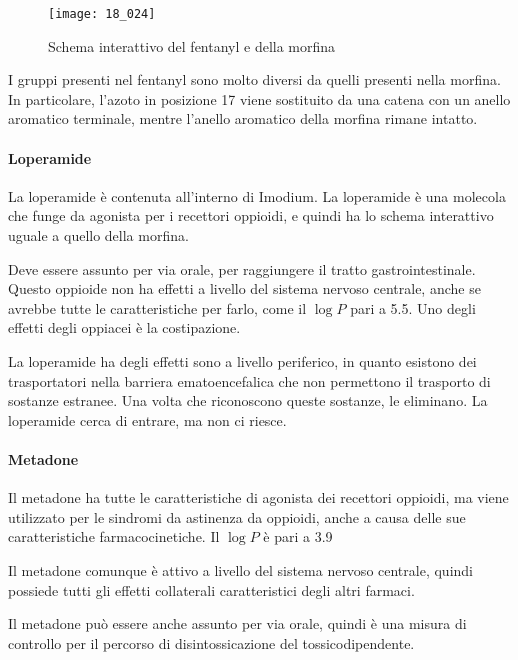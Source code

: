 \begin{figure}[H]
  \centering
  \texttt{[image: 18\_024]}
  \caption{Schema interattivo del fentanyl e della morfina}
\end{figure}

I gruppi presenti nel fentanyl sono molto diversi da quelli presenti
nella morfina. In particolare, l'azoto in posizione 17 viene sostituito
da una catena con un anello aromatico terminale, mentre l'anello
aromatico della morfina rimane intatto.

\paragraph{Loperamide}
La loperamide è contenuta all'interno di Imodium. La loperamide è una
molecola che funge da agonista per i recettori oppioidi, e quindi ha lo
schema interattivo uguale a quello della morfina.

Deve essere assunto per via orale, per raggiungere il tratto
gastrointestinale. Questo oppioide non ha effetti a livello del sistema
nervoso centrale, anche se avrebbe tutte le caratteristiche per farlo,
come il \(\log{} P\) pari a 5.5. Uno degli effetti degli oppiacei è la
costipazione.

La loperamide ha degli effetti sono a livello periferico, in quanto
esistono dei trasportatori nella barriera ematoencefalica che non
permettono il trasporto di sostanze estranee. Una volta che riconoscono
queste sostanze, le eliminano. La loperamide cerca di entrare, ma non ci
riesce.

\paragraph{Metadone}
Il metadone ha tutte le caratteristiche di agonista dei recettori
oppioidi, ma viene utilizzato per le sindromi da astinenza da oppioidi,
anche a causa delle sue caratteristiche farmacocinetiche. Il
\(\log{} P\) è pari a 3.9

Il metadone comunque è attivo a livello del sistema nervoso centrale,
quindi possiede tutti gli effetti collaterali caratteristici degli altri
farmaci.

Il metadone può essere anche assunto per via orale, quindi è una misura
di controllo per il percorso di disintossicazione del tossicodipendente.